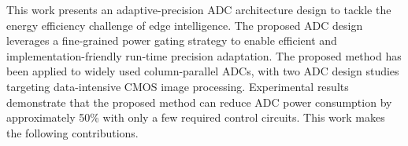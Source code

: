 
This work presents an adaptive-precision ADC architecture design to tackle the energy efficiency challenge of edge intelligence. 
The proposed ADC design leverages a fine-grained power gating strategy to enable efficient and implementation-friendly run-time 
precision adaptation. The proposed method has been applied to widely used column-parallel ADCs, with two ADC design studies targeting 
data-intensive CMOS image processing. Experimental results demonstrate that the proposed method can reduce ADC power consumption 
by approximately 50\% with only a few required control circuits. This work makes the following contributions. 




